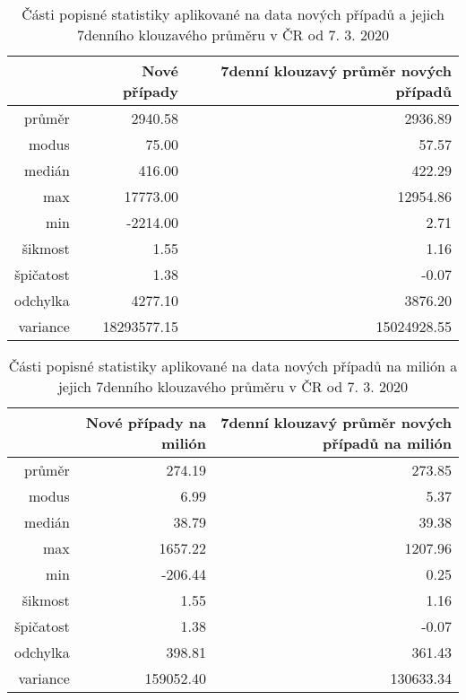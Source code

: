 \documentclass[a4paper, 12pt]{article}
\begin{document}
\begin{table}[ht]
\centering
\begin{tabular}{rrr}
  \hline
 & Nové případy & 7denní klouzavý průměr nových případů \\ 
  \hline
průměr & 2940.58 & 2936.89 \\ 
  modus & 75.00 & 57.57 \\ 
  medián & 416.00 & 422.29 \\ 
  max & 17773.00 & 12954.86 \\ 
  min & -2214.00 & 2.71 \\ 
  šikmost & 1.55 & 1.16 \\ 
  špičatost & 1.38 & -0.07 \\ 
  odchylka & 4277.10 & 3876.20 \\ 
  variance & 18293577.15 & 15024928.55 \\ 
   \hline
\end{tabular}
\caption{Části popisné statistiky aplikované na data nových případů a jejich 7denního klouzavého průměru v ČR od 7. 3. 2020} 
\label{table:popisStat}
\end{table}%
\begin{table}[ht]
\centering
\begin{tabular}{rrr}
  \hline
 & Nové případy na milión & 7denní klouzavý průměr nových případů na milión \\ 
  \hline
průměr & 274.19 & 273.85 \\ 
  modus & 6.99 & 5.37 \\ 
  medián & 38.79 & 39.38 \\ 
  max & 1657.22 & 1207.96 \\ 
  min & -206.44 & 0.25 \\ 
  šikmost & 1.55 & 1.16 \\ 
  špičatost & 1.38 & -0.07 \\ 
  odchylka & 398.81 & 361.43 \\ 
  variance & 159052.40 & 130633.34 \\ 
   \hline
\end{tabular}
\caption{Části popisné statistiky aplikované na data nových případů na milión a jejich 7denního klouzavého průměru v ČR od 7. 3. 2020} 
\label{table:popisStat}
\end{table}%
\end{document}
